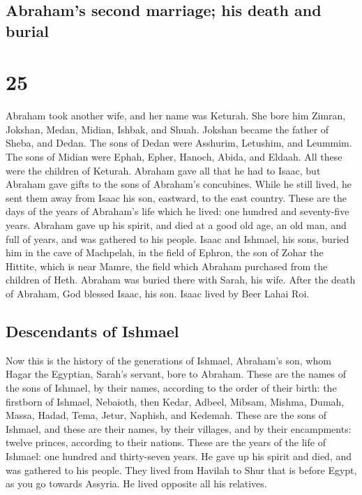\hypertarget{abrahams-second-marriage-his-death-and-burial}{%
\subsection{Abraham's second marriage; his death and
burial}\label{abrahams-second-marriage-his-death-and-burial}}

\hypertarget{section-24}{%
\section{25}\label{section-24}}

 Abraham took another wife, and her name was Keturah.
 She bore him Zimran, Jokshan, Medan, Midian, Ishbak, and
Shuah.  Jokshan became the father of Sheba, and Dedan. The
sons of Dedan were Asshurim, Letushim, and Leummim.  The
sons of Midian were Ephah, Epher, Hanoch, Abida, and Eldaah. All these
were the children of Keturah.  Abraham gave all that he
had to Isaac,  but Abraham gave gifts to the sons of
Abraham's concubines. While he still lived, he sent them away from Isaac
his son, eastward, to the east country.  These are the
days of the years of Abraham's life which he lived: one hundred and
seventy-five years.  Abraham gave up his spirit, and died
at a good old age, an old man, and full of years, and was gathered to
his people.  Isaac and Ishmael, his sons, buried him in
the cave of Machpelah, in the field of Ephron, the son of Zohar the
Hittite, which is near Mamre,  the field which Abraham
purchased from the children of Heth. Abraham was buried there with
Sarah, his wife.  After the death of Abraham, God blessed
Isaac, his son. Isaac lived by Beer Lahai Roi.

\hypertarget{descendants-of-ishmael}{%
\subsection{Descendants of Ishmael}\label{descendants-of-ishmael}}

 Now this is the history of the generations of Ishmael,
Abraham's son, whom Hagar the Egyptian, Sarah's servant, bore to
Abraham.  These are the names of the sons of Ishmael, by
their names, according to the order of their birth: the firstborn of
Ishmael, Nebaioth, then Kedar, Adbeel, Mibsam,  Mishma,
Dumah, Massa,  Hadad, Tema, Jetur, Naphish, and Kedemah.
 These are the sons of Ishmael, and these are their
names, by their villages, and by their encampments: twelve princes,
according to their nations.  These are the years of the
life of Ishmael: one hundred and thirty-seven years. He gave up his
spirit and died, and was gathered to his people.  They
lived from Havilah to Shur that is before Egypt, as you go towards
Assyria. He lived opposite all his relatives.

